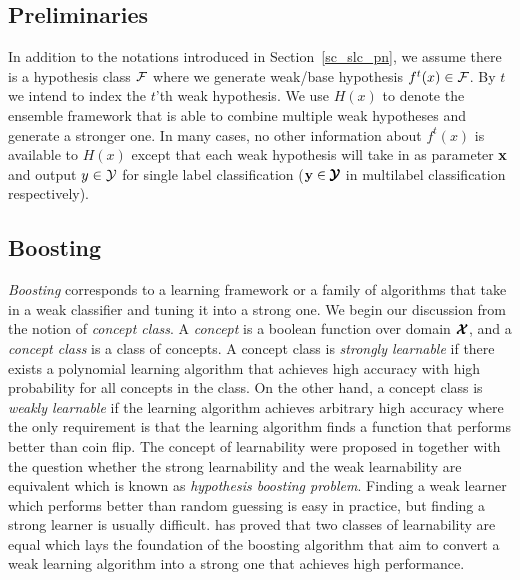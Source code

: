 {%
%
\subsection{Preliminaries} \label{sc_em_pn}

In addition to the notations introduced in Section~\ref{sc_slc_pn}, we assume there is a hypothesis class $\mathcal{F}$ where we generate weak/base hypothesis $f^t(x)\in\mathcal{F}$.
By $t$ we intend to index the $t$'th weak hypothesis.
We use $H(x)$ to denote the ensemble framework that is able to combine multiple weak hypotheses and generate a stronger one.
In many cases, no other information about $f^t(x)$ is available to $H(x)$ except that each weak hypothesis will take in as parameter $\mathbf {x}$ and output $y\in\mathcal{Y}$ for single label classification ($\mathbf {y}\in\pmb {\mathcal{Y}}$ in multilabel classification respectively).


\subsection{Boosting} \label{sc_boosting}

\textit{Boosting} corresponds to a learning framework or a family of algorithms that take in a weak classifier and tuning it into a strong one.
We begin our discussion from the notion of  \textit{concept class}.
A \textit{concept} is a boolean function over domain $\pmb {\mathcal{X}}$, and a \textit{concept class} is a class of concepts.
A concept class is \textit{strongly learnable} if there exists a polynomial learning algorithm that achieves high accuracy with high probability for all concepts in the class.
On the other hand, a concept class is \textit{weakly learnable} if the learning algorithm achieves arbitrary high accuracy where the only requirement is that the learning algorithm finds a function that performs better than coin flip.
The concept of learnability were proposed in \citep{Kearns94cryptographic} together with the question whether the strong learnability and the weak learnability are equivalent which is known as \textit{hypothesis boosting problem}.
Finding a weak learner which performs better than random guessing is easy in practice, but finding a strong learner is usually difficult.
\citet{Schapire90the} has proved that two classes of learnability are equal which lays the foundation of the boosting algorithm that aim to convert a weak learning algorithm into a strong one that achieves high performance.

}

